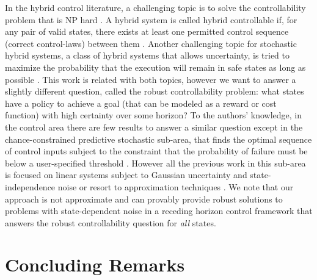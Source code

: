\documentclass[letterpaper]{article}
\begin{document}
In the hybrid control literature, a challenging topic is to solve the
controllability problem that is NP hard \cite{Blondel:1999}. A hybrid
system is called hybrid controllable if, for any pair of valid states,
there exists at least one permitted control sequence (correct
control-laws) between them \cite{Tittus:1998,Yang:2007}.  Another
challenging topic for stochastic hybrid systems, a class of hybrid
systems that allows uncertainty, is tried to maximize the probability
that the execution will remain in safe states as long as
possible \cite{Hu:2000}.  This work is related with both topics,
however we want to answer a slightly different question, called the
robust controllability problem: what states have a policy to achieve a
goal (that can be modeled as a reward or cost function) with high
certainty over some horizon?  To the authors’ knowledge, in the
control area there are few results to answer a similar question except
in the chance-constrained predictive stochastic sub-area, that finds
the optimal sequence of control inputs subject to the constraint that
the probability of failure must be below a user-specified
threshold \cite{Blackmore:2011}. However all the previous work in this
sub-area is focused on linear systems subject to Gaussian uncertainty
and state-independence
noise \cite{Schwarm:1999,Li:2002,Ono:2008,Blackmore:2011} or resort to
approximation techniques \cite{Blackmore:2010}.  We note that 
our approach is not approximate and can provably provide robust solutions to problems with
state-dependent noise in a receding horizon control framework that
answers the robust controllability question for \emph{all} states.

\section{Concluding Remarks}
\end{document}

